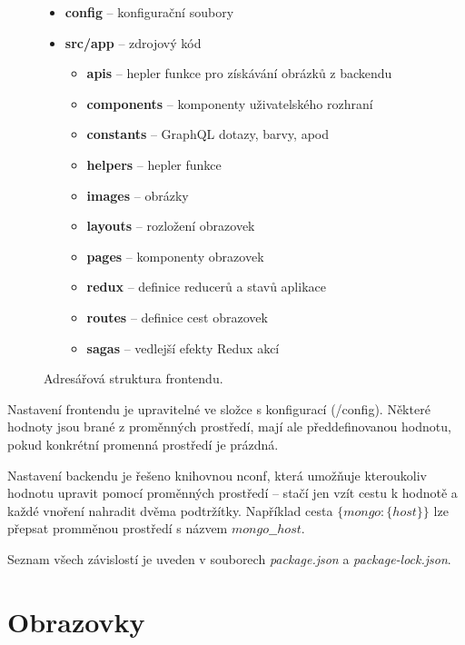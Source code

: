\begin{figure}[!htb]
    \begin{itemize}
      \setlength\itemsep{.05em}
      \item \textbf{config} -- konfigurační soubory
      \item \textbf{src/app} -- zdrojový kód
      \begin{itemize}
        \setlength\itemsep{.05em}
        \item \textbf{apis} -- hepler funkce pro získávání obrázků z backendu
        \item \textbf{components} -- komponenty uživatelského rozhraní
        \item \textbf{constants} -- GraphQL dotazy, barvy, apod
        \item \textbf{helpers} -- hepler funkce
        \item \textbf{images} -- obrázky
        \item \textbf{layouts} -- rozložení obrazovek
        \item \textbf{pages} -- komponenty obrazovek
        \item \textbf{redux} -- definice reducerů a stavů aplikace
        \item \textbf{routes} -- definice cest obrazovek
        \item \textbf{sagas} -- vedlejší efekty Redux akcí
      \end{itemize}
    \end{itemize}
    \caption{Adresářová struktura frontendu.}
    \label{fig:structure_front}
  \end{figure}

\newpage

Nastavení frontendu je upravitelné ve složce s konfigurací (/config).
Některé hodnoty jsou brané z proměnných prostředí, mají ale předdefinovanou hodnotu, pokud
konkrétní promenná prostředí je prázdná.

Nastavení backendu je řešeno knihovnou nconf, která umožňuje kteroukoliv hodnotu upravit
pomocí proměnných prostředí -- stačí jen vzít cestu k hodnotě a každé vnoření nahradit 
dvěma podtržítky.
\citep[viz][]{nconf}
Například cesta $\{ mongo: \{ host \} \}$ lze přepsat promměnou prostředí s názvem $mongo\_\_host$.

Seznam všech závislostí je uveden v souborech \textit{package.json} a \textit{package-lock.json}.

\section{Obrazovky}


